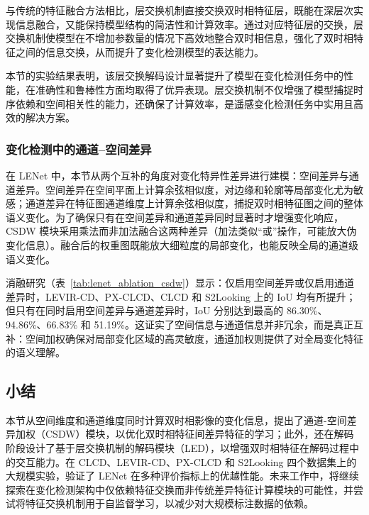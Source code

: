 与传统的特征融合方法相比，层交换机制直接交换双时相特征层，既能在深层次实现信息融合，又能保持模型结构的简洁性和计算效率。通过对应特征层的交换，层交换机制使模型在不增加参数量的情况下高效地整合双时相信息，强化了双时相特征之间的信息交换，从而提升了变化检测模型的表达能力。

本节的实验结果表明，该层交换解码设计显著提升了模型在变化检测任务中的性能，在准确性和鲁棒性方面均取得了优异表现。层交换机制不仅增强了模型捕捉时序依赖和空间相关性的能力，还确保了计算效率，是遥感变化检测任务中实用且高效的解决方案。

\subsubsection{变化检测中的通道–空间差异}
在 LENet 中，本节从两个互补的角度对变化特异性差异进行建模：空间差异与通道差异。空间差异在空间平面上计算余弦相似度，对边缘和轮廓等局部变化尤为敏感；通道差异在特征图通道维度上计算余弦相似度，捕捉双时相特征图之间的整体语义变化。为了确保只有在空间差异和通道差异同时显著时才增强变化响应，CSDW 模块采用乘法而非加法融合这两种差异（加法类似“或”操作，可能放大伪变化信息）。融合后的权重图既能放大细粒度的局部变化，也能反映全局的通道级语义变化。

消融研究（表~\ref{tab:lenet_ablation_csdw}）显示：仅启用空间差异或仅启用通道差异时，LEVIR-CD、PX-CLCD、CLCD 和 S2Looking 上的 IoU 均有所提升；但只有在同时启用空间差异与通道差异时，IoU 分别达到最高的 86.30\%、94.86\%、66.83\% 和 51.19\%。这证实了空间信息与通道信息并非冗余，而是真正互补：空间加权确保对局部变化区域的高灵敏度，通道加权则提供了对全局变化特征的语义理解。


\subsection{小结}

本节从空间维度和通道维度同时计算双时相影像的变化信息，提出了通道-空间差异加权（CSDW）模块，以优化双时相特征间差异特征的学习；此外，还在解码阶段设计了基于层交换机制的解码模块（LED），以增强双时相特征在解码过程中的交互能力。在 CLCD、LEVIR-CD、PX-CLCD 和 S2Looking 四个数据集上的大规模实验，验证了 LENet 在多种评价指标上的优越性能。未来工作中，将继续探索在变化检测架构中仅依赖特征交换而非传统差异特征计算模块的可能性，并尝试将特征交换机制用于自监督学习，以减少对大规模标注数据的依赖。

